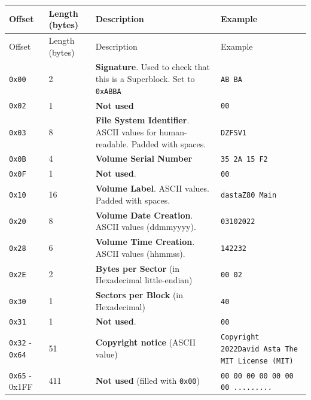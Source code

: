 \documentclass[a4paper,11pt]{article}
\begin{document}
        \begin{longtable}{ |m{2.2cm}|m{1.3cm}|m{6cm}|m{2.7cm}| }
            \hline
            \rowcolor{lightgray}
            Offset & Length (bytes) & Description & Example\\
            \hline
            \endfirsthead

            \hline
            \rowcolor{lightgray}
            Offset & Length (bytes) & Description & Example\\
            \hline
            \endhead

            \texttt{0x00} & 2 & \textbf{Signature}. Used to check that this is a
            Superblock. Set to \texttt{0xABBA} & \texttt{AB BA}\\
            \hline
            \texttt{0x02} & 1 & \textbf{Not used} & \texttt{00}\\
            \hline
            \texttt{0x03} & 8 & \textbf{File System Identifier}. ASCII values
            for human-readable. Padded with spaces. & \texttt{DZFSV1}\\
            \hline
            \texttt{0x0B} & 4 & \textbf{Volume Serial Number} &
            \texttt{35 2A 15 F2}\\
            \hline
            \texttt{0x0F} & 1 & \textbf{Not used}. & \texttt{00}\\
            \hline
            \texttt{0x10} & 16 & \textbf{Volume Label}. ASCII values. Padded
            with spaces. & \texttt{dastaZ80 Main}\\
            \hline
            \texttt{0x20} & 8 & \textbf{Volume Date Creation}. ASCII values
            (ddmmyyyy). & \texttt{03102022}\\
            \hline
            \texttt{0x28} & 6 & \textbf{Volume Time Creation}. ASCII values
            (hhmmss). & \texttt{142232}\\
            \hline
            \texttt{0x2E} & 2 & \textbf{Bytes per Sector} (in Hexadecimal
            little-endian) & \texttt{00 02}\\
            \hline
            \texttt{0x30} & 1 & \textbf{Sectors per Block} (in Hexadecimal) &
            \texttt{40}\\
            \hline
            \texttt{0x31} & 1 & \textbf{Not used}. & \texttt{00}\\
            \hline
            \texttt{0x32} - \texttt{0x64} & 51 & \textbf{Copyright notice}
            (ASCII value) & \texttt{Copyright 2022David Asta The MIT License
            (MIT)}\\
            \hline
            \texttt{0x65} - 0x1FF & 411 & \textbf{Not used} (filled with
            \texttt{0x00}) & \texttt{00 00 00 00 00 00 00 .........}\\
            \hline
        \end{longtable}
\end{document}
